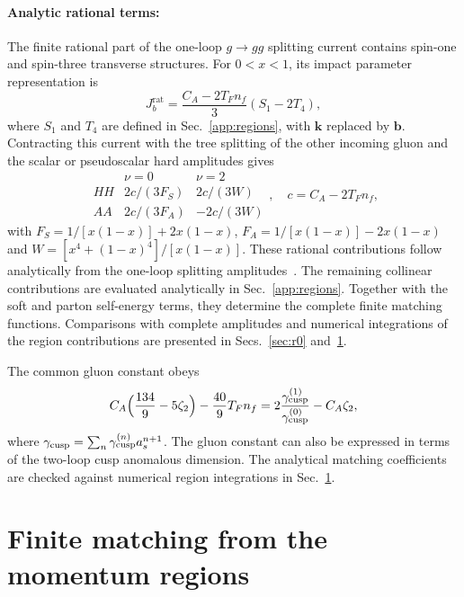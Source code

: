 \documentclass[%
 onecolumn,
 superscriptaddress,
 preprintnumbers,
 nofootinbib,
 amsmath,amssymb,
 aps,
 prl,
]{revtex4-2}
\newcommand{\kk}{\boldsymbol k}
\newcommand{\bb}{\boldsymbol b}
\begin{document}
\paragraph{Analytic rational terms: }
The finite rational part of the
one-loop $g\to gg$ splitting current
contains spin-one and spin-three
transverse structures.
For $0<x<1$, its impact parameter
representation is
\begin{equation}
J_b^{\mathrm{rat}}
=\frac{C_A-2T_Fn_f}{3}(S_1-2T_4),
\label{eq:r0rational}
\end{equation}
where $S_1$ and $T_4$ are defined
in Sec.~\ref{app:regions}, with
$\kk$ replaced by $\bb$.
%
Contracting this current with the
tree splitting of the other incoming
gluon and the scalar or pseudoscalar
hard amplitudes gives
\begin{equation}
\begin{array}{c|cc}
&\nu=0&\nu=2\\ \hline
HH&2c/(3F_S)&2c/(3W)\\
AA&2c/(3F_A)&-2c/(3W)
\end{array},
\quad c=C_A-2T_Fn_f,
\label{eq:r0paritymatrix}
\end{equation}
with
$F_S=1/[x(1-x)]+2x(1-x)$,
$F_A=1/[x(1-x)]-2x(1-x)$
and $W=[x^4+(1-x)^4]/[x(1-x)]$.
%
These rational contributions follow
analytically from the one-loop
splitting amplitudes~\cite{Bern:1999ry,Kosower:1999xi}.
The remaining collinear contributions are evaluated
analytically in Sec.~\ref{app:regions}.
Together with the soft and parton self-energy terms,
they determine the complete finite matching functions.
Comparisons with complete amplitudes and numerical
integrations of the region contributions are
presented in Secs.~\ref{sec:r0} and~\ref{sec:r0regions}.
%

%
The common gluon constant obeys
\[
C_A\Big(\frac{134}9-5\zeta_2\Big)
-\frac{40}9T_Fn_f
=
2\frac{\gamma_{\rm cusp}^{(1)}}
{\gamma_{\rm cusp}^{(0)}}-C_A\zeta_2,
\]
where
$\gamma_{\rm cusp}
=\sum_n\gamma_{\rm cusp}^{(n)}a_s^{n+1}$.
The gluon constant can also be expressed
in terms of the two-loop cusp anomalous dimension.
The analytical matching coefficients are checked against
numerical region integrations in Sec.~\ref{sec:r0regions}.






\section{Finite matching from the momentum regions}
\label{sec:r0regions}
\end{document}
